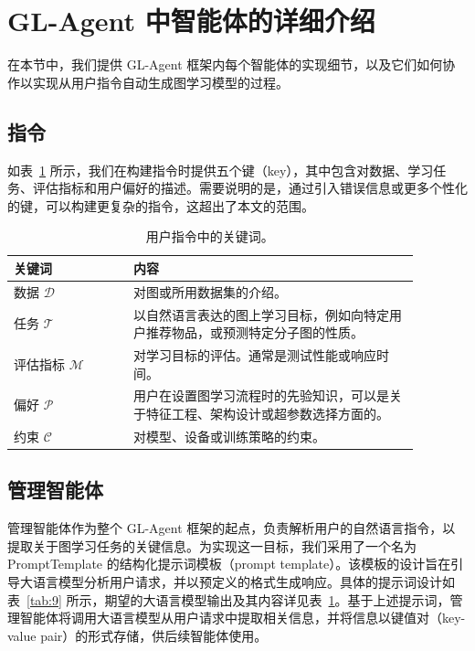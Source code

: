 \documentclass[11pt,UTF8,fontset=fandol]{ctexart}
\begin{document}
\appendix

\section{GL-Agent 中智能体的详细介绍}

在本节中，我们提供 GL-Agent 框架内每个智能体的实现细节，以及它们如何协作以实现从用户指令自动生成图学习模型的过程。

\subsection{指令}

如表~\ref{tab:8} 所示，我们在构建指令时提供五个键（key），其中包含对数据、学习任务、评估指标和用户偏好的描述。需要说明的是，通过引入错误信息或更多个性化的键，可以构建更复杂的指令，这超出了本文的范围。

\begin{table}[H]\centering
\caption{用户指令中的关键词。}
\label{tab:8}
\renewcommand{\arraystretch}{1.3}
\begin{tabular}{p{0.26\linewidth} p{0.62\linewidth}}
\toprule
关键词 & 内容 \\
\midrule
数据 $\mathcal{D}$ & 对图或所用数据集的介绍。 \\
任务 $\mathcal{T}$ & 以自然语言表达的图上学习目标，例如向特定用户推荐物品，或预测特定分子图的性质。 \\
评估指标 $\mathcal{M}$ & 对学习目标的评估。通常是测试性能或响应时间。 \\
偏好 $\mathcal{P}$ & 用户在设置图学习流程时的先验知识，可以是关于特征工程、架构设计或超参数选择方面的。 \\
约束 $\mathcal{C}$ & 对模型、设备或训练策略的约束。 \\
\bottomrule
\end{tabular}
\end{table}

\subsection{管理智能体}

管理智能体作为整个 GL-Agent 框架的起点，负责解析用户的自然语言指令，以提取关于图学习任务的关键信息。为实现这一目标，我们采用了一个名为 PromptTemplate 的结构化提示词模板（prompt template）。该模板的设计旨在引导大语言模型分析用户请求，并以预定义的格式生成响应。具体的提示词设计如表~\ref{tab:9} 所示，期望的大语言模型输出及其内容详见表~\ref{tab:8}。基于上述提示词，管理智能体将调用大语言模型从用户请求中提取相关信息，并将信息以键值对（key-value pair）的形式存储，供后续智能体使用。
\end{document}
